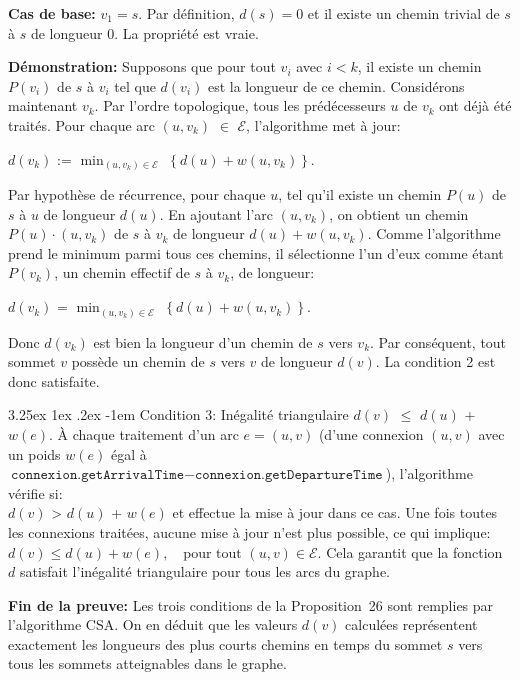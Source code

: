 \documentclass[12pt]{article}
\makeatletter
\renewcommand\paragraph{\@startsection{paragraph}{5}{\z@}%
  {3.25ex \@plus1ex \@minus.2ex}%
  {-1em}%
  {\normalfont\normalsize\bfseries}}
\makeatother
\begin{document}
\textbf{Cas de base:} $v_1 = s$. Par définition, $d(s) = 0$ et il existe un chemin trivial de $s$ à $s$ de longueur 0. La propriété est vraie.

\textbf{Démonstration:} Supposons que pour tout $v_i$ avec $i < k$, il existe un chemin $P(v_i)$ de $s$ à $v_i$ tel que $d(v_i)$ est la longueur de ce 
chemin. Considérons maintenant $v_k$. Par l'ordre topologique, tous les prédécesseurs $u$ de $v_k$ ont déjà été traités. Pour chaque arc $(u, v_k)$ $\in$ $\mathcal{E}$, l'algorithme met à jour:


$d(v_k)$ := $\min_{(u, v_k) \in \mathcal{E}}$ $\left\{ d(u) + w(u, v_k) \right\}$.


Par hypothèse de récurrence, pour chaque $u$, tel qu'il existe un chemin $P(u)$ de $s$ à $u$ de longueur $d(u)$. En ajoutant l'arc $(u, v_k)$, on obtient un chemin
$P(u) \cdot (u, v_k)$ de $s$ à $v_k$ de longueur $d(u) + w(u, v_k)$. Comme l'algorithme prend le minimum parmi tous ces chemins, il sélectionne l'un 
d'eux comme étant $P(v_k)$, un chemin effectif de $s$ à $v_k$, de longueur:

$d(v_k)$ = $\min_{(u, v_k) \in \mathcal{E}}$ $\left\{ d(u) + w(u, v_k) \right\}$.


Donc $d(v_k)$ est bien la longueur d'un chemin de $s$ vers $v_k$. Par conséquent, tout sommet $v$ possède un chemin de $s$ vers $v$ de 
longueur $d(v)$. La condition 2 est donc satisfaite.

\paragraph{Condition 3:}
Inégalité triangulaire $d(v)$ $\leq$ $d(u)$ + $w(e)$.
À chaque traitement d'un arc $e = (u, v)$ (d'une connexion $(u, v)$ avec un poids $w(e)$ égal à $\texttt{connexion.getArrivalTime} - \texttt{connexion.getDepartureTime}$),
l'algorithme vérifie si:\\
$d(v)$ > $d(u)$ + $w(e)$
et effectue la mise à jour dans ce cas. Une fois toutes les connexions traitées, aucune mise à jour n'est plus possible, ce qui implique:
$d(v) \leq d(u) + w(e),\quad \text{pour tout } (u, v) \in \mathcal{E}$.
Cela garantit que la fonction $d$ satisfait l'inégalité triangulaire pour tous les arcs du graphe.

\textbf{Fin de la preuve:} 
Les trois conditions de la Proposition~26 sont remplies par l'algorithme CSA. On en déduit que les valeurs $d(v)$ 
calculées représentent exactement les longueurs des plus courts chemins en temps du sommet $s$ vers tous les sommets atteignables dans le graphe.
\end{document}
